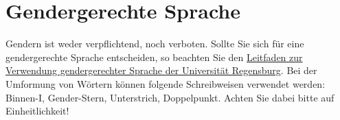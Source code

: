 \section{Gendergerechte Sprache}
Gendern ist weder verpflichtend, noch verboten.
Sollte Sie sich für eine gendergerechte Sprache entscheiden, so beachten Sie den \href{https://www.uni-regensburg.de/assets/rechtsgrundlagen/leitfaden-gendergerechte-sprache.pdf}{Leitfaden zur Verwendung gendergerechter Sprache der Universität Regensburg}. Bei der Umformung von Wörtern können folgende Schreibweisen verwendet werden: Binnen-I, Gender-Stern, Unterstrich, Doppelpunkt. Achten Sie dabei bitte auf Einheitlichkeit!
